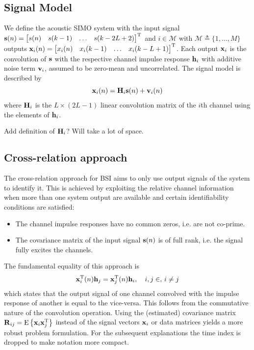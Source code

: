 \documentclass{article}
\newcommand{\h}{\mtxb{h}}
\newcommand{\x}{\mtxb{x}}
\newcommand{\R}{\mtxb{R}}
\newcommand{\Mset}{\mathcal{M}}
\begin{document}
\subsection{Signal Model}
\label{ssec:signal_model}
We define the acoustic SIMO system with the input signal \(\bm{\mathrm{s}}(n) = \begin{bmatrix}
    s(n)&s(k-1)&\ldots&s(k-2L+2)
\end{bmatrix}^{{\mathrm{T}}}\) and \(i \in \Mset\) with \(\Mset \triangleq \{1,\ldots,M\} \) outputs 
\(
    \x_i(n) = \begin{bmatrix}
        x_i(n)&x_i(k-1)&\ldots&x_i(k-L+1)
    \end{bmatrix}^{\T}
\).
Each output \(\x_i\) is the convolution of \(\bm{\mathrm{s}}\) with the respective channel impulse response \(\h_i\) with additive noise term \(\bm{\mathrm{v}}_i\), assumed to be zero-mean and uncorrelated.
The signal model is described by
\begin{equation}
    \x_i(n) = \mtxb{H}_i \mtxb{s}(n) + \mtxb{v}_i(n)
\end{equation}
where \(\bm{\mathrm{H}}_i\) is the \(L \times (2L-1)\) linear convolution matrix of the \(i\)th channel using the elements of \(\h_i\).
\begin{note}
    Add definition of \(\bm{\mathrm{H}}_i\)? Will take a lot of space.
\end{note}

\subsection{Cross-relation approach}
\label{ssec:cross_rel}
The cross-relation approach for BSI \cite{} aims to only use output signals of the system to identify it.
This is achieved by exploiting the relative channel information when more than one system output are available and certain identifiability conditions \cite{} are satisfied:
\begin{itemize}
    \item The channel impulse responses have no common zeros, i.e. are not co-prime.
    \item The covariance matrix of the input signal \(\bm{\mathrm{s}}(n)\) is of full rank, i.e. the signal fully excites the channels.
\end{itemize}

\noindent The fundamental equality of this approach is 
\begin{equation}
    \x_i^{\T}(n) \h_j = \x_j^{\T}(n) \h_i,\quad i,j \in ,\,i\neq j\label{eq:cross_rel:equality_conv}
\end{equation}
which states that the output signal of one channel convolved with the impulse response of another is equal to the vice-versa.
This follows from the commutative nature of the convolution operation.
Using the (estimated) covariance matrix \(\R_{ij} = \ev{\x_i \x_j^\T}\) instead of the signal vectors \(\x_i\) or data matrices yields a more robust problem formulation.
For the subsequent explanations the time index is dropped to make notation more compact.
\end{document}
